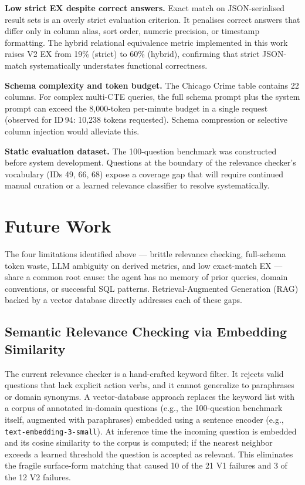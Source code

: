 \documentclass{article}
\begin{document}
\textbf{Low strict EX despite correct answers.}
Exact match on JSON-serialised result sets is an overly strict evaluation criterion. It penalises correct answers that differ only in column alias, sort order, numeric precision, or timestamp formatting. The hybrid relational equivalence metric implemented in this work raises V2 EX from 19\% (strict) to 60\% (hybrid), confirming that strict JSON-match systematically understates functional correctness.

\textbf{Schema complexity and token budget.}
The Chicago Crime table contains 22 columns. For complex multi-CTE queries, the full schema prompt plus the system prompt can exceed the 8,000-token per-minute budget in a single request (observed for ID\,94: 10,238 tokens requested). Schema compression or selective column injection would alleviate this.

\textbf{Static evaluation dataset.}
The 100-question benchmark was constructed before system development. Questions at the boundary of the relevance checker's vocabulary (IDs 49, 66, 68) expose a coverage gap that will require continued manual curation or a learned relevance classifier to resolve systematically.

\section{Future Work}

The four limitations identified above --- brittle relevance checking, full-schema token waste, LLM ambiguity on derived metrics, and low exact-match EX --- share a common root cause: the agent has no memory of prior queries, domain conventions, or successful SQL patterns. Retrieval-Augmented Generation (RAG) \cite{lewis2020rag} backed by a vector database directly addresses each of these gaps.

\subsection{Semantic Relevance Checking via Embedding Similarity}

The current relevance checker is a hand-crafted keyword filter. It rejects valid questions that lack explicit action verbs, and it cannot generalize to paraphrases or domain synonyms. A vector-database approach replaces the keyword list with a corpus of annotated in-domain questions (e.g., the 100-question benchmark itself, augmented with paraphrases) embedded using a sentence encoder (e.g., \texttt{text-embedding-3-small}). At inference time the incoming question is embedded and its cosine similarity to the corpus is computed; if the nearest neighbor exceeds a learned threshold the question is accepted as relevant. This eliminates the fragile surface-form matching that caused 10 of the 21 V1 failures and 3 of the 12 V2 failures.
\end{document}
